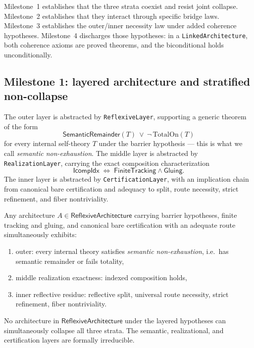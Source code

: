 \documentclass[11pt]{article}
\newcommand{\FinTrack}{\ensuremath{\mathsf{FiniteTracking}}}
\newcommand{\Glue}{\ensuremath{\mathsf{Gluing}}}
\newcommand{\Comp}{\ensuremath{\mathsf{IcompIdx}}}
\newcommand{\SemRem}{\ensuremath{\mathsf{SemanticRemainder}}}
\newcommand{\RAL}{\ensuremath{\mathsf{ReflexiveArchitecture}}}
\begin{document}
Milestone~1 establishes that the three strata coexist and resist joint collapse.
Milestone~2 establishes that they interact through specific bridge laws.
Milestone~3 establishes the outer/inner necessity law under added coherence hypotheses.
Milestone~4 discharges those hypotheses: in a \texttt{LinkedArchitecture}, both
coherence axioms are proved theorems, and the biconditional holds unconditionally.

\subsection{Milestone 1: layered architecture and stratified non-collapse}

The outer layer is abstracted by \texttt{ReflexiveLayer}, supporting a generic theorem
of the form
\[
\SemRem(T)\ \lor\ \neg\, \mathrm{TotalOn}(T)
\]
for every internal self-theory $T$ under the barrier hypothesis — this is what we call
\emph{semantic non-exhaustion}.  The middle layer is abstracted by
\texttt{RealizationLayer}, carrying the exact composition characterization
\[
\Comp \;\Longleftrightarrow\; \FinTrack \wedge \Glue.
\]
The inner layer is abstracted by \texttt{CertificationLayer}, with an implication chain
from canonical bare certification and adequacy to split, route necessity, strict
refinement, and fiber nontriviality.

\begin{theorem}
\label{thm:layered}
Any architecture $A \in \RAL$ carrying barrier hypotheses, finite tracking and gluing,
and canonical bare certification with an adequate route simultaneously exhibits:
\begin{enumerate}[label=(\alph*), leftmargin=2em]
\item outer: every internal theory satisfies \emph{semantic non-exhaustion}, i.e.\
has semantic remainder or fails totality,
\item middle realization exactness: indexed composition holds,
\item inner reflective residue: reflective split, universal route necessity, strict
refinement, fiber nontriviality.
\end{enumerate}
\par{}
\end{theorem}

\begin{theorem}
\label{thm:noncollapse}
No architecture in $\RAL$ under the layered hypotheses can simultaneously collapse
all three strata.  The semantic, realizational, and certification layers are formally
irreducible.
\par{}
\end{theorem}
\end{document}

